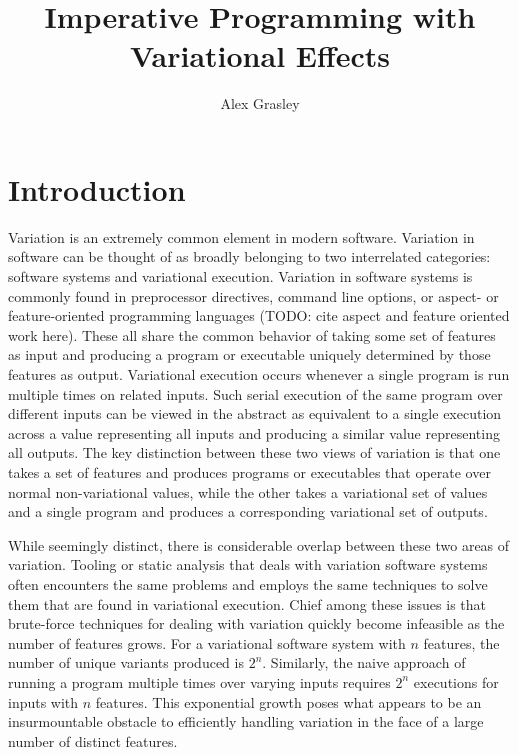 \documentclass[onehalf,11pt]{beavtex}
\title{Imperative Programming with Variational Effects}
\author{Alex Grasley}
\begin{document}
\maketitle

\mainmatter

\chapter{Introduction}
\label{ch:intro}

Variation is an extremely common element in modern software. Variation in software can be
thought of as broadly belonging to two interrelated categories: software systems and variational execution.
Variation in software systems is commonly found in preprocessor directives, command line options, or aspect- or feature-oriented
programming languages (TODO: cite aspect and feature oriented work here).
These all share the common behavior of taking some set of features as input and
producing a program or executable uniquely determined by those features as output. Variational execution occurs whenever a single
program is run multiple times on related inputs. Such serial execution of the same program over different inputs can be viewed in the abstract
as equivalent to a single execution across a value representing all inputs and producing a similar value representing all outputs.
The key distinction between these two views of variation is that one takes a set of features and produces programs or executables that
operate over normal non-variational values, while the other takes a variational set of values and a single program and produces a corresponding variational set of outputs.

While seemingly distinct, there is considerable overlap between these two areas of variation. Tooling or static analysis that deals with
variation software systems often encounters the same problems and employs the same techniques to solve them
that are found in variational execution. Chief among these issues is that brute-force techniques for dealing with variation quickly become infeasible as the
number of features grows. For a variational software system with $n$ features, the number of unique variants produced is $2^n$. Similarly, the naive approach
of running a program multiple times over varying inputs requires $2^n$ executions for inputs with $n$ features. This exponential growth poses what appears to
be an insurmountable obstacle to efficiently handling variation in the face of a large number of distinct features.
\end{document}
